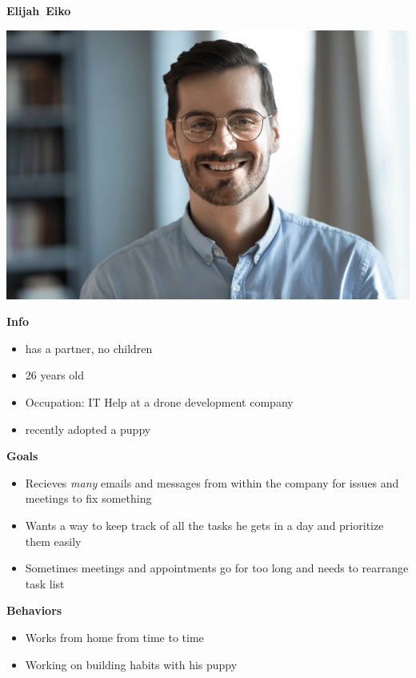 \textbf{Elijah~Eiko}

\includegraphics[width=.3\textwidth]{../common/personas/res/Elijah.png}

\textbf{Info}
\begin{itemize}
  \item has a partner, no children
  \item 26 years old
  \item Occupation: IT Help at a drone development company
  \item recently adopted a puppy
\end{itemize}

\textbf{Goals}
\begin{itemize}
  \item Recieves \textit{many} emails and messages from within the company for issues and meetings to fix something
  \item Wants a way to keep track of all the tasks he gets in a day and prioritize them easily
  \item Sometimes meetings and appointments go for too long and needs to rearrange task list
\end{itemize}

\textbf{Behaviors}
\begin{itemize}
  \item Works from home from time to time
  \item Working on building habits with his puppy
\end{itemize}
